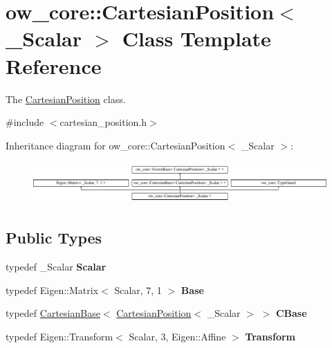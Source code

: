 \hypertarget{classow__core_1_1CartesianPosition}{}\section{ow\+\_\+core\+:\+:Cartesian\+Position$<$ \+\_\+\+Scalar $>$ Class Template Reference}
\label{classow__core_1_1CartesianPosition}


The \hyperlink{classow__core_1_1CartesianPosition}{Cartesian\+Position} class.  




{\ttfamily \#include $<$cartesian\+\_\+position.\+h$>$}

Inheritance diagram for ow\+\_\+core\+:\+:Cartesian\+Position$<$ \+\_\+\+Scalar $>$\+:\begin{figure}[H]
\begin{center}
\leavevmode
\includegraphics[height=1.613833cm]{d0/d5b/classow__core_1_1CartesianPosition}
\end{center}
\end{figure}
\subsection*{Public Types}
\begin{DoxyCompactItemize}
\item 
typedef \+\_\+\+Scalar {\bfseries Scalar}\hypertarget{classow__core_1_1CartesianPosition_a2d3bae7b8988a5956f61233244a8a038}{}\label{classow__core_1_1CartesianPosition_a2d3bae7b8988a5956f61233244a8a038}

\item 
typedef Eigen\+::\+Matrix$<$ Scalar, 7, 1 $>$ {\bfseries Base}\hypertarget{classow__core_1_1CartesianPosition_a51a56b2c4b9830555602ade3e777fdd8}{}\label{classow__core_1_1CartesianPosition_a51a56b2c4b9830555602ade3e777fdd8}

\item 
typedef \hyperlink{classow__core_1_1CartesianBase}{Cartesian\+Base}$<$ \hyperlink{classow__core_1_1CartesianPosition}{Cartesian\+Position}$<$ \+\_\+\+Scalar $>$ $>$ {\bfseries C\+Base}\hypertarget{classow__core_1_1CartesianPosition_aaf942e70bf19a4fe77a6f734a92b2809}{}\label{classow__core_1_1CartesianPosition_aaf942e70bf19a4fe77a6f734a92b2809}

\item 
typedef Eigen\+::\+Transform$<$ Scalar, 3, Eigen\+::\+Affine $>$ {\bfseries Transform}\hypertarget{classow__core_1_1CartesianPosition_a9c129146a77674691e1c04fe79d142db}{}\label{classow__core_1_1CartesianPosition_a9c129146a77674691e1c04fe79d142db}

\end{DoxyCompactItemize}
